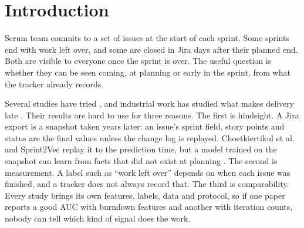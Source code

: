 \documentclass[journal]{IEEEtran}
\begin{document}
\section{Introduction}

 Scrum team commits to a set of issues at the start of each sprint. Some sprints end with work left over, and some are closed in Jira days after their planned end. Both are visible to everyone once the sprint is over. The useful question is whether they can be seen coming, at planning or early in the sprint, from what the tracker already records.

Several studies have tried \cite{choet2018,sprint2vec,hearty2009,perez2024,obike2025}, and industrial work has studied what makes delivery late \cite{kula2022}. Their results are hard to use for three reasons. The first is hindsight. A Jira export is a snapshot taken years later: an issue's sprint field, story points and status are the final values unless the change log is replayed. Choetkiertikul et al.\ \cite{choet2018} and Sprint2Vec \cite{sprint2vec} replay it to the prediction time, but a model trained on the snapshot can learn from facts that did not exist at planning \cite{kaufman2012,kapoor2023}. The second is measurement. A label such as ``work left over'' depends on when each issue was finished, and a tracker does not always record that. The third is comparability. Every study brings its own features, labels, data and protocol, so if one paper reports a good AUC with burndown features and another with iteration counts, nobody can tell which kind of signal does the work.
\end{document}
